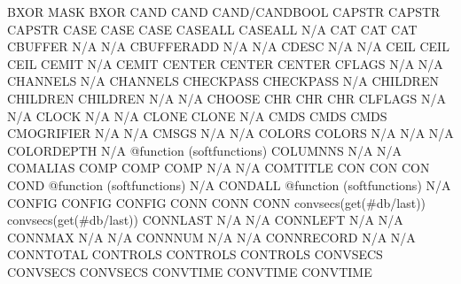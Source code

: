 \documentclass[letterpaper,10pt,english]{sphinxmanual}
\begin{document}
\begin{description}
BXOR                    MASK                         BXOR
CAND                    CAND                         CAND/CANDBOOL
CAPSTR                  CAPSTR                       CAPSTR
CASE                    CASE                         CASE
CASEALL                 CASEALL                      N/A
CAT                     CAT                          CAT
CBUFFER                 N/A                          N/A
CBUFFERADD              N/A                          N/A
CDESC                   N/A                          N/A
CEIL                    CEIL                         CEIL
CEMIT                   N/A                          CEMIT
CENTER                  CENTER                       CENTER
CFLAGS                  N/A                          N/A
CHANNELS                N/A                          CHANNELS
CHECKPASS               CHECKPASS                    N/A
CHILDREN                CHILDREN                     CHILDREN
N/A                     N/A                          CHOOSE
CHR                     CHR                          CHR
CLFLAGS                 N/A                          N/A
CLOCK                   N/A                          N/A
CLONE                   CLONE                        N/A
CMDS                    CMDS                         CMDS
CMOGRIFIER              N/A                          N/A
CMSGS                   N/A                          N/A
COLORS                  COLORS                       N/A
N/A                     N/A                          COLORDEPTH
N/A                     @function (softfunctions)    COLUMNNS
N/A                     N/A                          COMALIAS
COMP                    COMP                         COMP
N/A                     N/A                          COMTITLE
CON                     CON                          CON
COND                    @function (softfunctions)    N/A
CONDALL                 @function (softfunctions)    N/A
CONFIG                  CONFIG                       CONFIG
CONN                    CONN                         CONN
convsecs(get(\#db/last)) convsecs(get(\#db/last))      CONNLAST
N/A                     N/A                          CONNLEFT
N/A                     N/A                          CONNMAX
N/A                     N/A                          CONNNUM
N/A                     N/A                          CONNRECORD
N/A                     N/A                          CONNTOTAL
CONTROLS                CONTROLS                     CONTROLS
CONVSECS                CONVSECS                     CONVSECS
CONVTIME                CONVTIME                     CONVTIME

\end{description}
\end{document}
